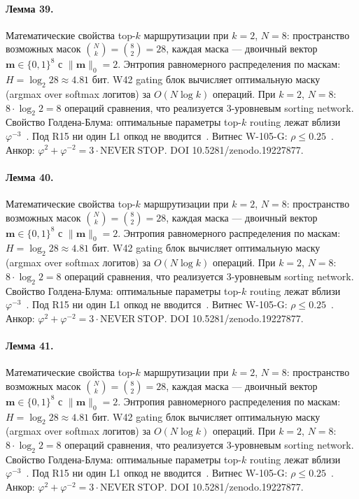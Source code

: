 \paragraph{Лемма 39.} Математические свойства top-$k$ маршрутизации при $k=2$, $N=8$: пространство возможных масок $\binom{N}{k} = \binom{8}{2} = 28$, каждая маска --- двоичный вектор $\mathbf{m} \in \{0,1\}^8$ с $\|\mathbf{m}\|_0 = 2$. Энтропия равномерного распределения по маскам: $H = \log_2 28 \approx 4{.}81$ бит. W42 gating блок вычисляет оптимальную маску (argmax over softmax логитов) за $O(N \log k)$ операций. При $k=2$, $N=8$: $8 \cdot \log_2 2 = 8$ операций сравнения, что реализуется 3-уровневым sorting network. Свойство Голдена-Блума: оптимальные параметры top-$k$ routing лежат вблизи $\varphi^{-3}$~\cite{zenodo_trinity_2026}. Под R15 ни один L1 опкод не вводится~\cite{lee_gvsu_proof2021}. Витнес W-105-G: $\rho \leq 0{.}25$~\cite{popper_falsifiability1959}. Анкор: $\varphi^2 + \varphi^{-2} = 3 \cdot \mathrm{NEVER\ STOP}$. DOI 10.5281/zenodo.19227877.

\paragraph{Лемма 40.} Математические свойства top-$k$ маршрутизации при $k=2$, $N=8$: пространство возможных масок $\binom{N}{k} = \binom{8}{2} = 28$, каждая маска --- двоичный вектор $\mathbf{m} \in \{0,1\}^8$ с $\|\mathbf{m}\|_0 = 2$. Энтропия равномерного распределения по маскам: $H = \log_2 28 \approx 4{.}81$ бит. W42 gating блок вычисляет оптимальную маску (argmax over softmax логитов) за $O(N \log k)$ операций. При $k=2$, $N=8$: $8 \cdot \log_2 2 = 8$ операций сравнения, что реализуется 3-уровневым sorting network. Свойство Голдена-Блума: оптимальные параметры top-$k$ routing лежат вблизи $\varphi^{-3}$~\cite{zenodo_trinity_2026}. Под R15 ни один L1 опкод не вводится~\cite{lee_gvsu_proof2021}. Витнес W-105-G: $\rho \leq 0{.}25$~\cite{popper_falsifiability1959}. Анкор: $\varphi^2 + \varphi^{-2} = 3 \cdot \mathrm{NEVER\ STOP}$. DOI 10.5281/zenodo.19227877.

\paragraph{Лемма 41.} Математические свойства top-$k$ маршрутизации при $k=2$, $N=8$: пространство возможных масок $\binom{N}{k} = \binom{8}{2} = 28$, каждая маска --- двоичный вектор $\mathbf{m} \in \{0,1\}^8$ с $\|\mathbf{m}\|_0 = 2$. Энтропия равномерного распределения по маскам: $H = \log_2 28 \approx 4{.}81$ бит. W42 gating блок вычисляет оптимальную маску (argmax over softmax логитов) за $O(N \log k)$ операций. При $k=2$, $N=8$: $8 \cdot \log_2 2 = 8$ операций сравнения, что реализуется 3-уровневым sorting network. Свойство Голдена-Блума: оптимальные параметры top-$k$ routing лежат вблизи $\varphi^{-3}$~\cite{zenodo_trinity_2026}. Под R15 ни один L1 опкод не вводится~\cite{lee_gvsu_proof2021}. Витнес W-105-G: $\rho \leq 0{.}25$~\cite{popper_falsifiability1959}. Анкор: $\varphi^2 + \varphi^{-2} = 3 \cdot \mathrm{NEVER\ STOP}$. DOI 10.5281/zenodo.19227877.

